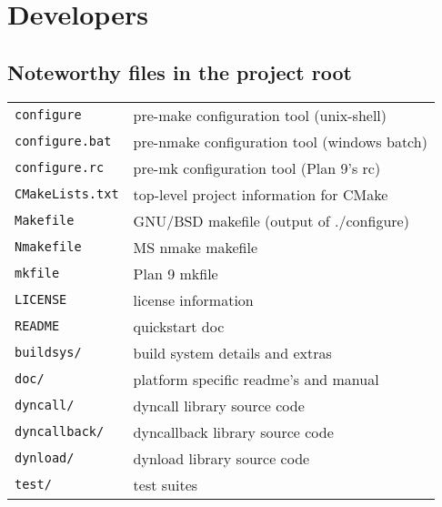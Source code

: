 %
%
%
%

\clearpage
\section{Developers}

\subsection{Noteworthy files in the project root}
\begin{tabular*}{0.75\textwidth}{ll}
{\tt configure}      & pre-make configuration tool (unix-shell)     \\
{\tt configure.bat}  & pre-nmake configuration tool (windows batch) \\
{\tt configure.rc}   & pre-mk configuration tool (Plan 9's rc)      \\
{\tt CMakeLists.txt} & top-level project information for CMake      \\
{\tt Makefile}       & GNU/BSD makefile (output of ./configure)     \\
{\tt Nmakefile}      & MS nmake makefile                            \\
{\tt mkfile}         & Plan 9 mkfile                                \\
{\tt LICENSE}        & license information                          \\
{\tt README}         & quickstart doc                               \\
{\tt buildsys/}      & build system details and extras              \\
{\tt doc/}           & platform specific readme's and manual        \\
{\tt dyncall/}       & dyncall library source code                  \\
{\tt dyncallback/}   & dyncallback library source code              \\
{\tt dynload/}       & dynload library source code                  \\
{\tt test/}          & test suites                                  \\
\end{tabular*}


